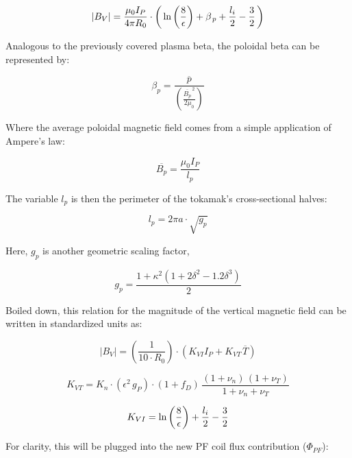 \begin{equation}
  |B_V| = \frac{\mu_0 I_P}{4 \pi R_0} \cdot \left( \,\textnormal{ln} \left(\frac{8}{\epsilon}\right) + \beta_{\,p} + \frac{l_i}{2} - \frac{3}{2} \, \right)
\end{equation} 

Analogous to the previously covered plasma beta, the poloidal beta can be represented by: \cite{elongation}

\begin{equation}
  \beta_p = \frac{\overline{p}}{\left( \frac{\overline{B_p}^{\,2}}{2 \mu_0} \right)}
\end{equation}

Where the average poloidal magnetic field comes from a simple application of Ampere's law:

\begin{equation}
	\overline{B_p} = \frac{\mu_0 I_P}{l_p}
\end{equation}

The variable $l_p$ is then the perimeter of the tokamak's cross-sectional halves:

\begin{equation}
	l_p = 2 \pi a \cdot \sqrt{g_p}
\end{equation}

Here, $g_p$ is another geometric scaling factor,

\begin{equation}
  g_p = \frac{1 + \kappa^2 ( 1 + 2 \delta^2 - 1.2\delta^3 )}{2} 
\end{equation}

Boiled down, this relation for the magnitude of the vertical magnetic field can be written in standardized units as:

\begin{equation}
	|B_V| = \left( \frac{ 1 }{ 10 \cdot R_0} \right) \cdot \left( K_{VI} I_P +  K_{VT\,} \overline{T}  \right)
\end{equation}

\begin{equation}
	K_{VT} = K_{n} \cdot ( \epsilon ^ 2 \, g_P ) \cdot ( 1 + f_D ) \, \frac{ (1 + \nu_n) \, (1 + \nu_T) }{1 + \nu_n + \nu_T }
\end{equation}

\begin{equation}
	K_{VI} = \textnormal{ln} \left(\frac{8}{\epsilon}\right) + \frac{l_i}{2} - \frac{3}{2}
\end{equation}

For clarity, this will be plugged into the new PF coil flux contribution ($\Phi_{PF}$):

